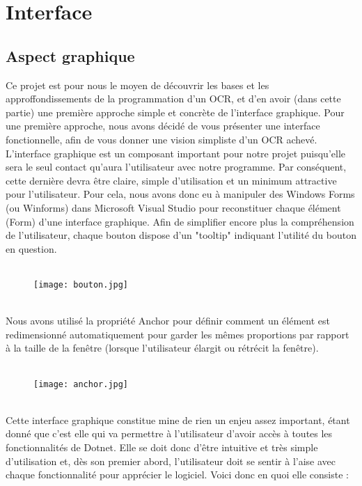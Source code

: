\documentclass{article}
\begin{document}
      \section{Interface }
              \subsection{Aspect graphique }
Ce projet est pour nous le moyen de découvrir les bases et les approffondissements de la programmation d’un OCR, et d’en avoir (dans cette partie) une première approche simple et concrète de l’interface graphique. Pour une première approche, nous avons décidé de vous présenter une interface fonctionnelle, afin de vous donner une vision simpliste d’un OCR achevé.\\

L’interface graphique est un composant important pour notre projet puisqu’elle sera le seul contact qu’aura l’utilisateur avec notre programme. Par conséquent, cette dernière  devra être claire, simple d’utilisation et un minimum attractive pour l’utilisateur. Pour cela, nous avons donc eu à manipuler des Windows Forms (ou Winforms) dans Microsoft Visual Studio pour reconstituer chaque élément (Form) d’une interface graphique. Afin de simplifier encore plus la compréhension de l’utilisateur, chaque bouton dispose d’un "tooltip" indiquant l’utilité du bouton en question.\\

\\
\begin{figure}[hp]
	\centering
    \texttt{[image: bouton.jpg]}
	 \label{Bouton }
\end{figure}
\\
Nous avons utilisé la propriété Anchor pour définir comment un élément est redimensionné
automatiquement pour garder les mêmes proportions par rapport à la taille
de la fenêtre (lorsque l’utilisateur élargit ou rétrécit la fenêtre).\\

\\
\begin{figure}[hp]
	\centering
    \texttt{[image: anchor.jpg]}
	 \label{Anchor}
\end{figure}
\\
Cette interface graphique constitue mine de rien un enjeu assez important, étant
donné que c’est elle qui va permettre à l’utilisateur d’avoir accès à toutes les fonctionnalités
de Dotnet. Elle se doit donc d’être intuitive et très simple d’utilisation et, dès
son premier abord, l’utilisateur doit se sentir à l’aise avec chaque fonctionnalité pour
apprécier le logiciel. Voici donc en quoi elle consiste :
\newpage
\end{document}
